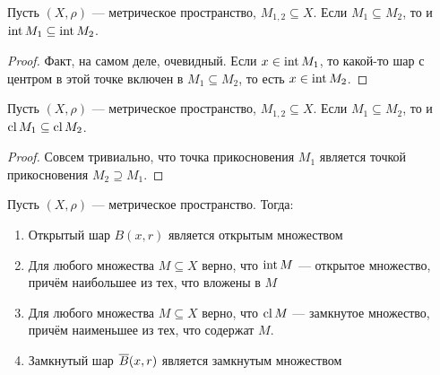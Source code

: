 \begin{lemma}
	Пусть $(X, \rho)$ --- метрическое пространство, $M_{1, 2} \subseteq X$. Если $M_1 \subseteq M_2$, то и $\operatorname{int} M_1 \subseteq \operatorname{int} M_2$.
\end{lemma}

\begin{proof}
	Факт, на самом деле, очевидный. Если $x \in \operatorname{int} M_1$, то какой-то шар с центром в этой точке включен в $M_1 \subseteq M_2$, то есть $x \in \operatorname{int} M_2$.
\end{proof}

\begin{lemma}
	Пусть $(X, \rho)$ --- метрическое пространство, $M_{1, 2} \subseteq X$. Если $M_1 \subseteq M_2$, то и $\operatorname{cl} M_1 \subseteq \operatorname{cl} M_2$.
\end{lemma}

\begin{proof}
	Совсем тривиально, что точка прикосновения $M_1$ является точкой прикосновения $M_2 \supseteq M_1$.
\end{proof}

\begin{theorem}
	Пусть $(X, \rho)$ --- метрическое пространство. Тогда:
	\begin{enumerate}
		\item Открытый шар $B(x, r)$ является открытым множеством
		
		\item Для любого множества $M \subseteq X$ верно, что $\operatorname{int} M$ --- открытое множество, причём наибольшее из тех, что вложены в $M$
		
		\item Для любого множества $M \subseteq X$ верно, что $\operatorname{cl} M$ --- замкнутое множество, причём наименьшее из тех, что содержат $M$.
		
		\item Замкнутый шар $\overline{B}(x, r)$ является замкнутым множеством
	\end{enumerate}
\end{theorem}

